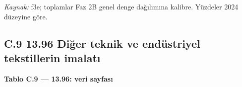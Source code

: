 \emph{Kaynak:} \etiketT{} f3e; toplamlar Faz 2B genel denge dağılımına kalibre. Yüzdeler 2024 düzeyine göre.

\hypertarget{nace_kartlar_13-15-c9-1396-diux11fer-teknik-ve-enduxfcstriyel-tekstillerin-imalatux131}{%
\subsection{C.9 13.96 Diğer teknik ve endüstriyel tekstillerin imalatı}\label{nace_kartlar_13-15-c9-1396-diux11fer-teknik-ve-enduxfcstriyel-tekstillerin-imalatux131}}


\textbf{Tablo C.9 --- 13.96: veri sayfası}

\nopagebreak[4]

\begingroup\gbtablo\small

